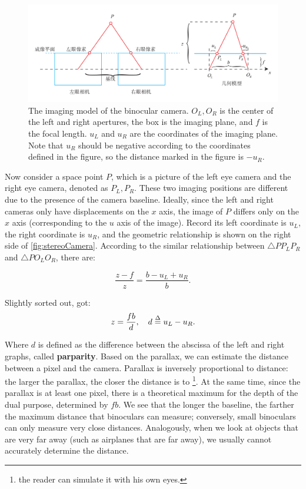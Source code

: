 \begin{figure}[!ht]
	\centering
	\includegraphics[width=1.0\textwidth]{chapter05/resources/cameraModel/stereoCamera.pdf}
	\caption{The imaging model of the binocular camera. $O_L, O_R$ is the center of the left and right apertures, the box is the imaging plane, and $f$ is the focal length. $u_L$ and $u_R$ are the coordinates of the imaging plane. Note that $u_R$ should be negative according to the coordinates defined in the figure, so the distance marked in the figure is $-u_R$. }
	\label{fig:stereoCamera}
\end{figure}

Now consider a space point $P$, which is a picture of the left eye camera and the right eye camera, denoted as $P_L, P_R$. These two imaging positions are different due to the presence of the camera baseline. Ideally, since the left and right cameras only have displacements on the $x$ axis, the image of $P$ differs only on the $x$ axis (corresponding to the $u$ axis of the image). Record its left coordinate is $u_L$, the right coordinate is $u_R$, and the geometric relationship is shown on the right side of \autoref{fig:stereoCamera}. According to the similar relationship between $\triangle PP_LP_R$ and $\triangle PO_LO_R$, there are:

\begin{equation}
\frac{{z - f}}{z} = \frac{{b - {u_L} + {u_R}}}{b}.
\end{equation}

Slightly sorted out, got:
\begin{equation}
z = \frac{{fb}}{d}, \quad d \buildrel \Delta \over = {u_L} - {u_R}.
\end{equation}

Where $d$ is defined as the difference between the abscissa of the left and right graphs, called \textbf{parparity}. Based on the parallax, we can estimate the distance between a pixel and the camera. Parallax is inversely proportional to distance: the larger the parallax, the closer the distance is to \footnote{the reader can simulate it with his own eyes. }. At the same time, since the parallax is at least one pixel, there is a theoretical maximum for the depth of the dual purpose, determined by $fb$. We see that the longer the baseline, the farther the maximum distance that binoculars can measure; conversely, small binoculars can only measure very close distances. Analogously, when we look at objects that are very far away (such as airplanes that are far away), we usually cannot accurately determine the distance.

